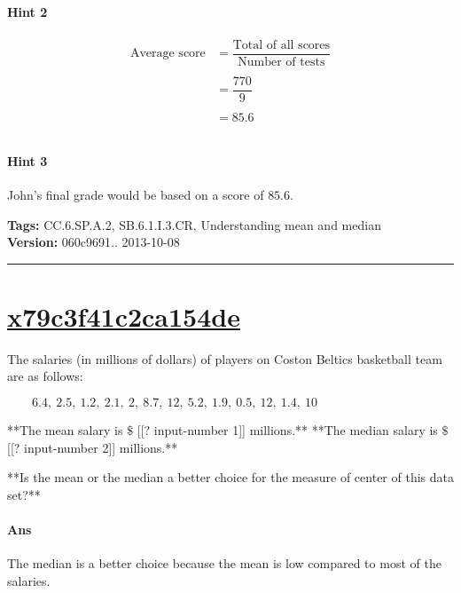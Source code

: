 \documentclass[twocolumn,10pt]{article}
\begin{document}
\paragraph{Hint 2}\begin{align*}\text{Average score}&=\dfrac{\text{Total of all scores}}{\text{Number of tests}}\\
\\
&=\dfrac{770}{9} \\
\\
&= 85.6 \\
\\
\end{align*}

\paragraph{Hint 3}John's final grade would be based on a score of $85.6$.



\medskip
\noindent
\textbf{Tags:} {\footnotesize CC.6.SP.A.2, SB.6.1.I.3.CR, Understanding mean and median}\\
\textbf{Version:} 060c9691.. 2013-10-08
\smallskip\hrule





\section{\href{https://www.khanacademy.org/devadmin/content/items/x79c3f41c2ca154de}{x79c3f41c2ca154de}}

\noindent
The salaries (in millions of dollars) of players on Coston Beltics basketball team are as follows:

$\qquad6.4,~2.5,~1.2,~2.1,~2,~8.7,~12,~5.2,~1.9,~0.5,~12,~1.4,~10$

**The mean salary is $\$$ [[? input-number 1]] millions.**  
**The median salary is $\$$ [[? input-number 2]] millions.**

**Is the mean or the median a better choice for the measure of center of this data set?**

\paragraph{Ans} 


 The median is a better choice because the mean is  low compared to most of the salaries.
\end{document}
